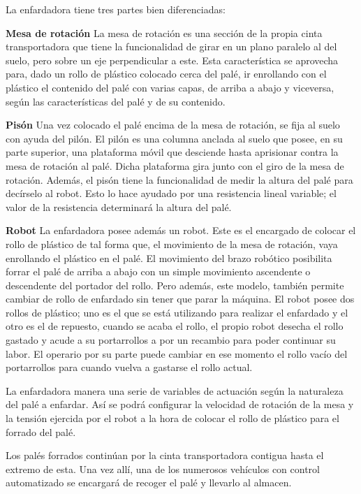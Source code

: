 \documentclass[11pt,a4paper,spanish,twoside]{report}
\begin{document}
La enfardadora tiene tres partes bien diferenciadas:
\begin{description}
\item \textbf{Mesa de rotación}
La mesa de rotación es una sección de la propia cinta transportadora que tiene 
la funcionalidad de girar en un plano paralelo al del suelo, pero sobre un eje 
perpendicular a este. Esta característica se aprovecha para, dado un rollo de 
plástico colocado cerca del palé, ir enrollando con el plástico el contenido 
del palé con varias capas, de arriba a abajo y viceversa, según las 
características del palé y de su contenido.
\item \textbf{Pisón}
Una vez colocado el palé encima de la mesa de rotación, se fija al suelo con 
ayuda del pilón. El pilón es una columna anclada al suelo que posee, en su 
parte superior, una plataforma móvil que desciende hasta aprisionar contra la
mesa de rotación al palé. Dicha plataforma gira junto con el giro de la mesa de
rotación. Además, el pisón tiene la funcionalidad de medir la altura del palé 
para decírselo al robot. Esto lo hace ayudado por una resistencia lineal
variable; el valor de la resistencia determinará la altura del palé.
\item \textbf{Robot}
La enfardadora posee además un robot. Este es el encargado de colocar el rollo 
de plástico de tal forma que, el movimiento de la mesa de rotación, vaya 
enrollando el plástico en el palé. El movimiento del brazo robótico posibilita 
forrar el palé de arriba a abajo con un simple movimiento ascendente o 
descendente del portador del rollo. Pero además, este modelo, también permite 
cambiar de rollo de enfardado sin tener que parar la máquina. El robot posee 
dos rollos de plástico; uno es el que se está utilizando para realizar el 
enfardado y el otro es el de repuesto, cuando se acaba el rollo, el propio 
robot desecha el rollo gastado y acude a su portarrollos a por un recambio para
poder continuar su labor. El operario por su parte puede cambiar en ese momento
el rollo vacío del portarrollos para cuando vuelva a gastarse el rollo actual.
\end{description}

La enfardadora manera una serie de variables de actuación según la naturaleza
del palé a enfardar. Así se podrá configurar la velocidad de rotación de la 
mesa y la tensión ejercida por el robot a la hora de colocar el rollo de 
plástico para el forrado del palé.

Los palés forrados continúan por la cinta transportadora contigua hasta el 
extremo de esta. Una vez allí, una de los numerosos vehículos con control 
automatizado se encargará de recoger el palé y llevarlo al almacen.
\end{document}
